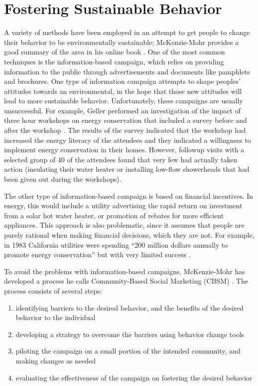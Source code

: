 \section{Fostering Sustainable Behavior}
\label{sec:fostering-behavior}

A variety of methods have been employed in an attempt to get people to change their behavior to be environmentally sustainable; McKenzie-Mohr provides a good summary of the area in his online book \cite{McKenzie-Mohr2009}. One of the most common techniques is the information-based campaign, which relies on providing information to the public through advertisements and documents like pamphlets and brochures. One type of information campaign attempts to shape peoples' attitudes towards an environmental, in the hope that those new attitudes will lead to more sustainable behavior. Unfortunately, these campaigns are usually unsuccessful. For example, Geller performed an investigation of the impact of three hour workshops on energy conservation that included a survey before and after the workshop \cite{Geller81}. The results of the survey indicated that the workshop had increased the energy literacy of the attendees and they indicated a willingness to implement energy conservation in their homes. However, followup visits with a selected group of 40 of the attendees found that very few had actually taken action (insulating their water heater or installing low-flow showerheads that had been given out during the workshops).

The other type of information-based campaign is based on financial incentives. In energy, this would include a utility advertising the rapid return on investment from a solar hot water heater, or promotion of rebates for more efficient appliances. This approach is also problematic, since it assumes that people are purely rational when making financial decisions, which they are not. For example, in 1983 California utilities were spending ``200 million dollars annually to promote energy conservation'' but with very limited success \cite{Costanzo86}.

To avoid the problems with information-based campaigns, McKenzie-Mohr has developed a process he calls Community-Based Social Marketing (CBSM) \cite{McKenzie-Mohr2009}. The process consists of several steps:

\begin{enumerate}
	\item identifying barriers to the desired behavior, and the benefits of the desired behavior to the individual
	\item developing a strategy to overcome the barriers using behavior change tools
	\item piloting the campaign on a small portion of the intended community, and making changes as needed
	\item evaluating the effectiveness of the campaign on fostering the desired behavior
\end{enumerate}

